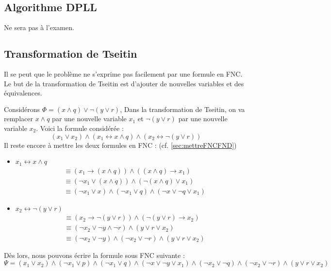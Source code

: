 \subsection{Algorithme DPLL}
Ne sera pas à l'examen.

\subsection{Transformation de Tseitin}
Il se peut que le problème ne s'exprime pas facilement par une formule en FNC. Le but de la transformation de Tseitin est d'ajouter de nouvelles variables et des équivalences.
\begin{example}
    Considérons $\Phi = (x \wedge q) \vee \neg(y \vee r)$, Dans la transformation de Tseitin, on va remplacer $x \wedge q$ par une nouvelle variable $x_1$ et $\neg(y \vee r)$ par une nouvelle variable $x_2$. Voici la formule considérée :
    \begin{equation*}
        (x_1\vee x_2) \wedge (x_1 \leftrightarrow x\wedge q) \wedge (x_2 \leftrightarrow \neg(y\vee r))
    \end{equation*}
    Il reste encore à mettre les deux formules en FNC : (cf. \ref{sec:mettreFNCFND})
    \begin{itemize}[label=\textbullet]
        \item $x_1 \leftrightarrow x \wedge q$
        \begin{equation*}
            \begin{aligned}
                &\equiv (x_1 \rightarrow (x \wedge q)) \wedge ((x \wedge q) \rightarrow x_1) \\
                &\equiv (\neg x_1 \vee (x \wedge q)) \wedge (\neg(x \wedge q) \vee x_1) \\
                &\equiv (\neg x_1 \vee x) \wedge (\neg x_1 \vee q) \wedge (\neg x \vee \neg q \vee x_1)
            \end{aligned}
        \end{equation*}
        \item $x_2 \leftrightarrow \neg(y\vee r)$
        \begin{equation*}
            \begin{aligned}
                &\equiv (x_2 \rightarrow \neg(y\vee r)) \wedge (\neg(y\vee r) \rightarrow x_2) \\
                &\equiv (\neg x_2 \vee \neg y \wedge \neg r)\wedge (y \vee r \vee x_2) \\
                &\equiv (\neg x_2 \vee \neg y) \wedge (\neg x_2 \vee \neg r) \wedge (y \vee r \vee x_2)
            \end{aligned}
        \end{equation*}
    \end{itemize}
    Dès lors, nous pouvons écrire la formule sous FNC suivante :
    \begin{equation*}
        \Psi = (x_1\vee x_2)\wedge(\neg x_1 \vee p)\wedge(\neg x_1\vee q)\wedge(\neg x \vee \neg y \vee x_1)\wedge(\neg x_2 \vee \neg q) \wedge (\neg x_2 \vee \neg r) \wedge (y \vee r \vee x_2)
    \end{equation*}
\end{example}
